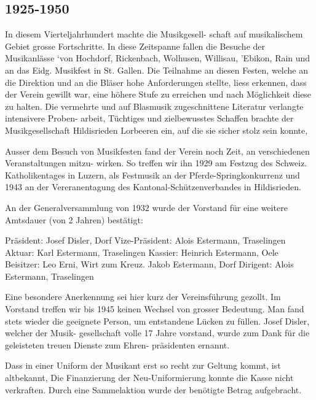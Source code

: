 \begin{multicols}{2}

    \subsection{1925-1950}

    In diesem Vierteljahrhundert machte die Musikgesell-
    schaft auf musikalischem Gebiet grosse Fortschritte.
    In diese Zeitspanne fallen die Besuche der Musikanlässe
    ‘von Hochdorf, Rickenbach, Wolhusen, Willisau,
    'Ebikon, Rain und an das Eidg. Musikfest in St. Gallen.
    Die Teilnahme an diesen Festen, welche an die
    Direktion und an die Bläser hohe Anforderungen
    stellte, liess erkennen, dass der Verein gewillt war,
    eine höhere Stufe zu erreichen und nach Möglichkeit
    diese zu halten. Die vermehrte und auf Blasmusik
    zugeschnittene Literatur verlangte intensivere Proben-
    arbeit, Tüchtiges und zielbewusstes Schaffen brachte
    der Musikgesellschaft Hildisrieden Lorbeeren ein, auf
    die sie sicher stolz sein konnte,

    Ausser dem Besuch von Musikfesten fand der Verein
    noch Zeit, an verschiedenen Veranstaltungen mitzu-
    wirken. So treffen wir ihn 1929 am Festzug des
    Schweiz. Katholikentages in Luzern, als Festmusik an
    der Pferde-Springkonkurrenz und 1943 an der
    Vereranentagung des Kantonal-Schützenverbandes in
    Hildisrieden.

    An der Generalversammlung von 1932 wurde der
    Vorstand für eine weitere Amtsdauer (von 2 Jahren)
    bestätigt:

    Präsident: Josef Disler, Dorf
    Vize-Präsident: Alois Estermann, Traselingen
    Aktuar: Karl Estermann, Traselingen
    Kassier: Heinrich Estermann, Oele
    Beisitzer: Leo Erni, Wirt zum Kreuz.
    Jakob Estermann, Dorf
    Dirigent: Alois Estermann, Traselingen


    Eine besondere Anerkennung sei hier kurz der
    Vereinsführung gezollt. Im Vorstand treffen wir bis
    1945 keinen Wechsel von grosser Bedeutung. Man
    fand stets wieder die geeignete Person, um entstandene
    Lücken zu füllen. Josef Disler, welcher der Musik-
    gesellschaft volle 17 Jahre vorstand, wurde zum Dank
    für die geleisteten treuen Dienste zum Ehren-
    präsidenten ernannt.

    Dass in einer Uniform der Musikant erst so recht zur
    Geltung kommt, ist altbekannt, Die Finanzierung der
    Neu-Uniformierung konnte die Kasse nicht verkraften.
    Durch eine Sammelaktion wurde der benötigte Betrag
    aufgebracht.


\end{multicols}
